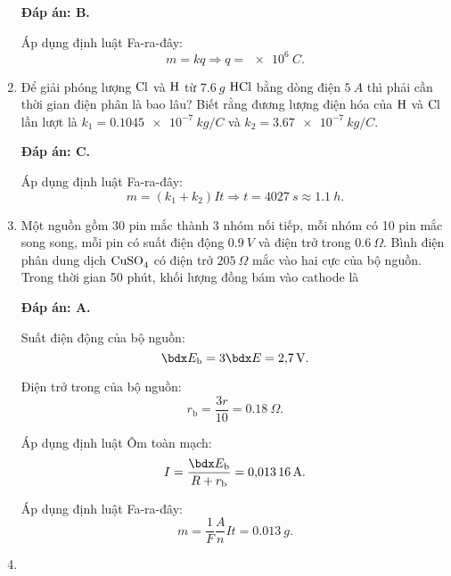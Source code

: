 \begin{enumerate}[label=\bfseries Câu \arabic*:]
{	}
	\loigiai
	{	\textbf{Đáp án: B.}
		
		Áp dụng định luật Fa-ra-đây:
		$$m=kq \Rightarrow q = \SI{e6}{C}.$$
	}
	\item {}
	
	\cauhoi
	{Để giải phóng lượng $\ce{Cl}$ và $\ce{H}$ từ $\SI{7.6}{g}$ $\ce{HCl}$ bằng dòng điện $\SI{5}{A}$ thì phải cần thời gian điện phân là bao lâu? Biết rằng đương lượng điện hóa của $\ce{H}$ và $\ce{Cl}$ lần lượt là $k_1 = \SI{0.1045e-7}{kg/C}$ và $k_2 = \SI{3.67e-7}{kg/C}$.
		
	}
	\loigiai
	{	\textbf{Đáp án: C.}
		
		Áp dụng định luật Fa-ra-đây:
		$$m=(k_1 + k_2) I t \Rightarrow t = \SI{4027}{s} \approx \SI{1.1}{h}.$$
	}
	\item {}
	
	\cauhoi
	{Một nguồn gồm 30 pin mắc thành 3 nhóm nối tiếp, mỗi nhóm có 10 pin mắc song song, mỗi pin có suất điện động $\SI{0.9}{V}$ và điện trở trong $\SI{0.6}{\Omega}$. Bình điện phân dung dịch $\ce{CuSO_4}$ có điện trở $\SI{205}{\Omega}$ mắc vào hai cực của bộ nguồn. Trong thời gian 50 phút, khối lượng đồng bám vào cathode là
		
	}
	\loigiai
	{	\textbf{Đáp án: A.}
		
		Suất điện động của bộ nguồn:
		$$\calE_\text{b} = 3 \calE = \SI{2.7}{V}.$$
		
		Điện trở trong của bộ nguồn:
		$$r_\text{b} = \dfrac{3r}{10} = \SI{0.18}{\Omega}.$$
		
		Áp dụng định luật Ôm toàn mạch:
		$$I=\dfrac{\calE_\text b}{R + r_\text b} = \SI{0.01316}{A}.$$
		
		Áp dụng định luật Fa-ra-đây:
		$$m=\dfrac{1}{F} \dfrac{A}{n} I t = \SI{0.013}{g}.$$
	}
	\item {}
	

\end{enumerate}
